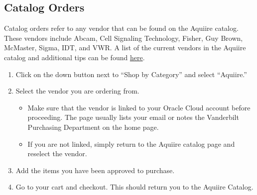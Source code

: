 \documentclass[
]{book}
\providecommand{\tightlist}{%
  \setlength{\itemsep}{0pt}\setlength{\parskip}{0pt}}
\begin{document}
\hypertarget{catalog-orders}{%
\subsection{Catalog Orders}\label{catalog-orders}}

Catalog orders refer to any vendor that can be found on the Aquiire catalog. These vendors include Abcam, Cell Signaling Technology, Fisher, Guy Brown, McMaster, Sigma, IDT, and VWR. A list of the current vendors in the Aquiire catalog and additional tips can be found \href{https://drive.google.com/file/d/1FoXTe82I5IBqeLMY3-MZ39DXdckFvCIQ/view?usp=sharing}{here}.

\begin{enumerate}
\def\labelenumi{\arabic{enumi}.}
\item
  Click on the down button next to ``Shop by Category'' and select ``Aquiire.''
\item
  Select the vendor you are ordering from.

  \begin{itemize}
  \tightlist
  \item
    Make sure that the vendor is linked to your Oracle Cloud account before proceeding. The page usually lists your email or notes the Vanderbilt Purchasing Department on the home page.
  \item
    If you are not linked, simply return to the Aquiire catalog page and reselect the vendor.
  \end{itemize}
\item
  Add the items you have been approved to purchase.
\item
  Go to your cart and checkout. This should return you to the Aquiire Catalog.


\end{enumerate}
\end{document}

